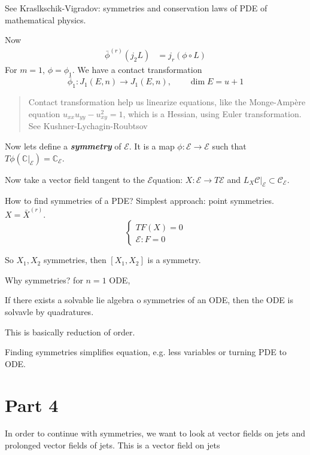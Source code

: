 See Kraslkschik-Vigradov: symmetries  and conservation laws of PDE of mathematical physics.

Now
\begin{align*}
\bar{\phi}^{(r)}(j_2L)&=j_r(\phi \circ L)
\end{align*}
For $m=1$, $\phi=\phi_1$. We have a contact transformation
\[\bar{\phi}_1:J_1(E,n) \longrightarrow J_1(E,n),\qquad  \dim E= u+1\]


\begin{quotation}
	Contact transformation help us linearize equations, like the Monge-Ampère equation $u_{xx}u_{y y}-u^2_{xy}=1$, which is a Hessian, using Euler transformation. See Kushner-Lychagin-Roubtsov
\end{quotation}

Now lets define a \textit{\textbf{symmetry}} of  $ \mathcal{E}$. It is a map $\phi:\mathcal{E}\to \mathcal{E}$ such that $T\phi(\mathbb{C}|_{\mathcal{E}})=\mathbb{C}_{\mathcal{E}}$.

Now take a vector field tangent to the $\mathcal{E}$quation: $X: \mathcal{E} \to T\mathcal{E}$ and $L_X\mathcal{C}|_{\mathcal{E}}\subset \mathcal{C}_{\mathcal{E}}$.

How to find symmetries of a PDE? Simplest approach: point symmetries. $X=\bar{X}^{(r)}$.
\[\begin{cases}
	TF(X)=0\\
	\mathcal{E}:F=0
\end{cases}\]

So $X_1,X_2$ symmetries, then $[X_1,X_2]$ is a symmetry.

Why symmetries? for $n=1$ ODE,

 \begin{thm}\leavevmode
If there exists a solvable lie algebra o symmetries of an ODE, then the ODE is solvavle by quadratures.
\end{thm}
This is basically reduction of order.

\begin{upshot}\leavevmode
	Finding symmetries simplifies equation, e.g. less variables or turning PDE to ODE.
\end{upshot}

\section{Part 4}

In order to continue with symmetries, we want to look at vector fields on jets and prolonged vector fields of jets. This is a vector field on jets


